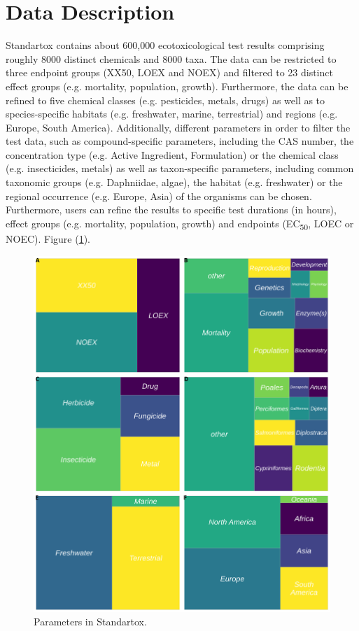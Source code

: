 \section{Data Description}

Standartox contains about 600,000 ecotoxicological test results comprising roughly 8000 distinct chemicals and 8000 taxa. The data can be restricted to three endpoint groups (XX50, LOEX and NOEX) and filtered to 23 distinct effect groups (e.g. mortality, population, growth). Furthermore, the data can be refined to five chemical classes (e.g. pesticides, metals, drugs) as well as to species-specific habitats (e.g. freshwater, marine, terrestrial) and regions (e.g. Europe, South America). Additionally, different parameters in order to filter the test data, such as compound-specific parameters, including the CAS number, the concentration type (e.g. Active Ingredient, Formulation) or the chemical class (e.g. insecticides, metals) as well as taxon-specific parameters, including common taxonomic groups (e.g. Daphniidae, algae), the habitat (e.g. freshwater) or the regional occurrence (e.g. Europe, Asia) of the organisms can be chosen. Furthermore, users can refine the results to specific test durations (in hours), effect groups (e.g. mortality, population, growth) and endpoints (EC\textsubscript{50}, LOEC or NOEC). Figure (\ref{fig:stx-parameters}).

\begin{figure}
    \includegraphics[width=1.0\textwidth]{article/figures/standartox_parameters.png}
    \caption{Parameters in Standartox.}
    \label{fig:stx-parameters}
\end{figure}

